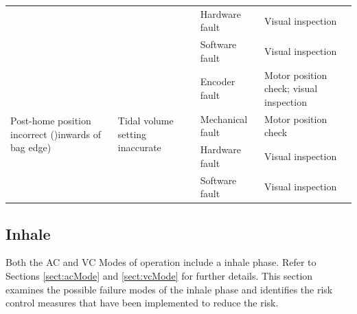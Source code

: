 \documentclass[]{article}
\begin{document}
\begin{center}
\begin{table}[h]
\begin{tabular}{ |p{3.5cm}|p{3cm}| p{3.5cm}| p{3.5cm}|}
	& & Hardware fault & Visual inspection\\ \cline{3-4}
	& & Software fault & Visual inspection\\ \hline
	\multirow{4}{3.5cm}{Post-home position incorrect ()inwards of bag edge)} & \multirow{4}{3cm}{Tidal volume setting inaccurate} & Encoder fault & Motor position check; visual inspection\\ \cline{3-4}
	& & Mechanical fault & Motor position check\\ \cline{3-4}
	& & Hardware fault & Visual inspection\\ \cline{3-4}
	& & Software fault & Visual inspection\\ \hline
	
\end{tabular}
\end{table}	
\end{center}


\subsection{Inhale}

Both the AC and VC Modes of operation include a inhale phase.  Refer to Sections \ref{sect:acMode} and \ref{sect:vcMode} for further details. This section examines the possible failure modes of the inhale phase and identifies the risk control measures that have been implemented to reduce the risk.
\end{document}
